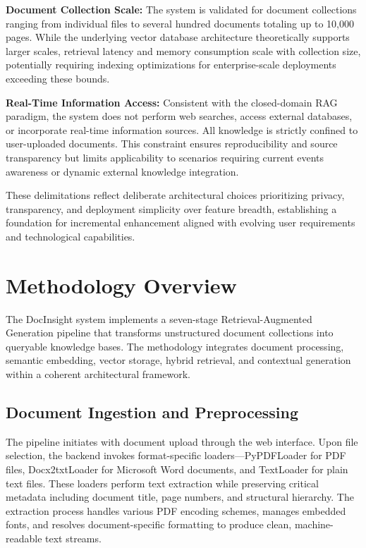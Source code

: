 \textbf{Document Collection Scale:} The system is validated for document collections ranging from individual files to several hundred documents totaling up to 10,000 pages. While the underlying vector database architecture theoretically supports larger scales, retrieval latency and memory consumption scale with collection size, potentially requiring indexing optimizations for enterprise-scale deployments exceeding these bounds.

\textbf{Real-Time Information Access:} Consistent with the closed-domain RAG paradigm, the system does not perform web searches, access external databases, or incorporate real-time information sources. All knowledge is strictly confined to user-uploaded documents. This constraint ensures reproducibility and source transparency but limits applicability to scenarios requiring current events awareness or dynamic external knowledge integration.

These delimitations reflect deliberate architectural choices prioritizing privacy, transparency, and deployment simplicity over feature breadth, establishing a foundation for incremental enhancement aligned with evolving user requirements and technological capabilities.

\section{Methodology Overview}

The DocInsight system implements a seven-stage Retrieval-Augmented Generation pipeline that transforms unstructured document collections into queryable knowledge bases. The methodology integrates document processing, semantic embedding, vector storage, hybrid retrieval, and contextual generation within a coherent architectural framework.

\subsection{Document Ingestion and Preprocessing}

The pipeline initiates with document upload through the web interface. Upon file selection, the backend invokes format-specific loaders---PyPDFLoader for PDF files, Docx2txtLoader for Microsoft Word documents, and TextLoader for plain text files. These loaders perform text extraction while preserving critical metadata including document title, page numbers, and structural hierarchy. The extraction process handles various PDF encoding schemes, manages embedded fonts, and resolves document-specific formatting to produce clean, machine-readable text streams.


